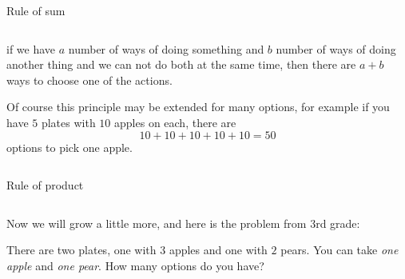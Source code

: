 \documentclass[9pt,aspectratio=169]{beamer}
\begin{document}
\begin{frame}{Rule of sum}
\begin{columns}[T]
\begin{column}{0.5\textwidth}
      \begin{definition}{}
        if we have $a$ number of ways of doing something and $b$ number of ways of doing another thing and we can not do both at the same time, then there are $a + b$ ways to choose one of the actions.
      \end{definition}

      Of course this principle may be extended for many options, for example if you have $5$ plates with $10$ apples on each, there are 
      \[10+10+10+10+10 = 50\] 
      options to pick one apple.
    \end{column}
  \end{columns}
\end{frame}

\begin{frame}{Rule of product}
  \begin{columns}[T]
    \begin{column}{0.5\textwidth}
      Now we will grow a little more, and here is the problem from 3rd grade:

      \begin{problem}
        There are two plates, one with $3$ apples and one with $2$ pears. You can take \emph{one apple} and \emph{one pear}. How many options do you have?
      \end{problem}

      \begin{nscenter}
      \end{nscenter}


\end{column}
\end{columns}
\end{frame}
\end{document}
